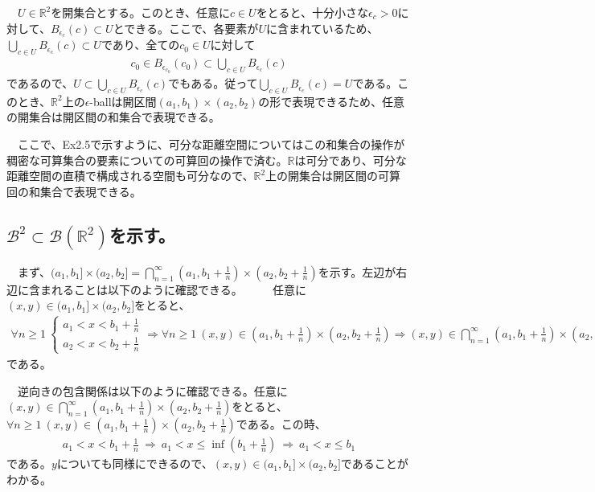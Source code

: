 \documentclass{article}
\begin{document}
　$U\in \mathbb{R}^2$を開集合とする。このとき、任意に$c\in U$をとると、十分小さな$\epsilon_c > 0$に対して、$B_{\epsilon_c}(c) \subset U$とできる。ここで、各要素が$U$に含まれているため、$\bigcup_{c\in U} B_{\epsilon_c}(c) \subset U$であり、全ての$c_0\in U$に対して
\begin{align*}
	c_0 \in B_{\epsilon_{c_0}}(c_0) \subset \bigcup_{c\in U} B_{\epsilon_c}(c)
\end{align*}
であるので、$U \subset \bigcup_{c\in U} B_{\epsilon_c}(c)$でもある。従って$\bigcup_{c\in U} B_{\epsilon_c}(c) = U$である。このとき、$\mathbb{R}^2$上の$\epsilon$-ballは開区間$(a_1,b_1)\times (a_2, b_2)$の形で表現できるため、任意の開集合は開区間の和集合で表現できる。

　ここで、Ex2.5で示すように、可分な距離空間についてはこの和集合の操作が稠密な可算集合の要素についての可算回の操作で済む。$\mathbb{R}$は可分であり、可分な距離空間の直積で構成される空間も可分なので、$\mathbb{R}^2$上の開集合は開区間の可算回の和集合で表現できる。
　

\subsection{$\mathcal{B}^2 \subset \mathcal{B} \left(\mathbb{R}^2 \right)$を示す。}
　まず、$(a_1, b_1] \times(a_2,b_2] = \bigcap_{n=1}^{\infty} (a_1, b_1+\frac{1}{n}) \times(a_2, b_2+\frac{1}{n})$を示す。左辺が右辺に含まれることは以下のように確認できる。
　
　任意に$(x,y) \in (a_1, b_1] \times(a_2,b_2]$をとると、
\begin{align*}
	\forall n\geq1\ \begin{cases}
	a_1 < x < b_1 + \frac{1}{n}\\
	a_2 < x < b_2 + \frac{1}{n}
	\end{cases}
	\Rightarrow
	\forall n\geq1\ (x,y)\in (a_1, b_1+\frac{1}{n})\times(a_2,b_2+\frac{1}{n})
	\Rightarrow
	(x, y)\in \bigcap_{n=1}^{\infty} (a_1, b_1+\frac{1}{n}) \times(a_2, b_2+\frac{1}{n})
\end{align*}
である。

　逆向きの包含関係は以下のように確認できる。任意に$(x,y) \in \bigcap_{n=1}^{\infty} (a_1, b_1+\frac{1}{n}) \times(a_2, b_2+\frac{1}{n})$をとると、$\forall n\geq1\ (x,y)\in (a_1, b_1+\frac{1}{n}) \times(a_2, b_2+\frac{1}{n})$である。この時、
\begin{align*}
	a_1 <x< b_1+\frac{1}{n}\ \Rightarrow\ a_1 < x \leq \inf \left(b_1 + \frac{1}{n}\right)\ \Rightarrow\ a_1 < x \leq b_1
\end{align*}
である。$y$についても同様にできるので、$(x,y) \in (a_1, b_1] \times(a_2,b_2]$であることがわかる。
\end{document}

